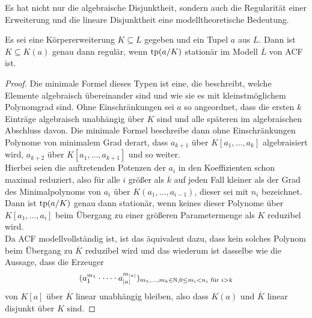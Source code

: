     Es hat nicht nur die algebraische Disjunktheit, sondern auch die Regularität einer Erweiterung und die lineare Disjunktheit eine modelltheoretische Bedeutung.
    
    \begin{lemma}
    	Es sei eine Körpererweiterung $K\subseteq L$ gegeben und ein Tupel $a$ aus $L$. Dann ist $K\subseteq K(a)$ genau dann regulär, wenn $\operatorname{tp}(a/K)$ stationär im Modell $\overline{L}$ von ACF ist.
    \end{lemma}
    \begin{proof}
    	Die minimale Formel dieses Typen ist eine, die beschreibt, welche Elemente algebraisch übereinander sind und wie sie es mit kleinstmöglichem Polynomgrad sind. Ohne Einschränkungen sei $a$ so angeordnet, dass die ersten $k$ Einträge algebraisch unabhängig über $K$ sind und alle späteren im algebraischen Abschluss davon.\newpage
    	Die minimale Formel beschreibe dann ohne Einschränkungen Polynome von minimalem Grad derart, dass $a_{k+1}$ über $K[a_1,\dots,a_k]$ algebraisiert wird, $a_{k+2}$ über $K[a_1,\dots,a_{k+1}]$ und so weiter.\\
    	Hierbei seien die auftretenden Potenzen der $a_i$ in den Koeffizienten schon maximal reduziert, also für alle $i$ größer als $k$ auf jeden Fall kleiner als der Grad des Minimalpolynoms von $a_i$ über $K(a_1,\dots,a_{i-1})$, dieser sei mit $n_i$ bezeichnet. Dann ist $\operatorname{tp}(a/K)$ genau dann stationär, wenn keines dieser Polynome über $K[a_1,\dots,a_i]$ beim Übergang zu einer größeren Parametermenge als $K$ reduzibel wird.\\
    	Da ACF modellvollständig ist, ist das äquivalent dazu, dass kein solches Polynom beim Übergang zu $\overline{K}$ reduzibel wird und das wiederum ist dasselbe wie die Aussage, dass die Erzeuger $$(a_1^{m_1}\cdot\dots\cdot a_{\left| a \right|}^{m_{\left| a \right|}})_{m_1,\dots,m_k\in\mathbb{N},0\leq m_i<n_i\text{ für }i>k}$$ von $K[a]$ über $\overline{K}$ linear unabhängig bleiben, also dass $K(a)$ und $\overline{K}$ linear disjunkt über $K$ sind.
    \end{proof}
    
